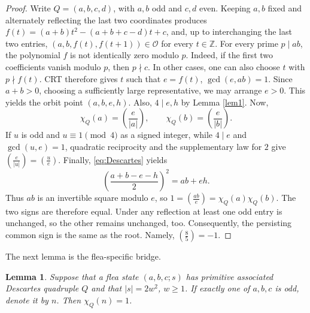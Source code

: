 \documentclass[12pt]{article}
\newtheorem{lemma}[theorem]{Lemma}
\theoremstyle{definition}
\theoremstyle{remark}
\newcommand{\Z}{\mathbb Z}
\newcommand{\OO}{\mathcal O}
\newcommand{\symb}[2]{\left(\frac{#1}{#2}\right)}
\begin{document}
\begin{proof}
Write $Q=(a,b,c,d)$, with $a,b$ odd and $c,d$ even. Keeping $a,b$ fixed and
alternately reflecting the last two coordinates produces
$f(t)=(a+b)t^2-(a+b+c-d)t+c$, and, up to interchanging the last two entries,
$(a,b,f(t),f(t+1))\in\OO$ for every $t\in\Z$. For every prime $p\mid ab$, the polynomial $f$ is not identically zero modulo $p$. Indeed, if the first two coefficients vanish modulo $p$, then $p\nmid c$. In other cases, one can also choose \(t\) with \(p\nmid f(t)\). CRT therefore gives $t$ such that $e=f(t)$,
$\gcd(e,ab)=1$. Since $a+b>0$, choosing a sufficiently large representative, we may arrange $e>0$. This yields the orbit point $(a,b,e,h)$. Also, $4\mid e,h$ by Lemma \ref{lem1}. Now,
\[
\chi_Q(a)=\symb{e}{|a|},\qquad \chi_Q(b)=\symb{e}{|b|}.
\]
If $u$ is odd and $u\equiv1\pmod4$ as a signed integer, while $4\mid e$ and
$\gcd(u,e)=1$, quadratic reciprocity and the supplementary law for $2$ give
$\symb{e}{|u|}=\symb{u}{e}$. Finally,  \eqref{eq:Descartes} yields
\[
\left(\frac{a+b-e-h}{2}\right)^2=ab+eh.
\]
Thus $ab$ is an invertible square modulo $e$, so
$1=\symb{ab}{e}=\chi_Q(a)\chi_Q(b)$. The two signs are therefore equal. Under any reflection at least one odd entry is unchanged, so the other remains unchanged, too. Consequently, the persisting common sign is the same as the root. Namely, $\symb{8}{5}=-1$.
\end{proof}

The next lemma is the flea-specific bridge.

\begin{lemma}\label{lem:ar}
	Suppose that a flea state $(a,b,c;s)$ has primitive associated Descartes
	quadruple $Q$ and that $|s|=2w^2$, $w\ge1$. If exactly one of $a,b,c$ is odd,
	denote it by $n$. Then $\chi_Q(n)=1$.
\end{lemma}
\end{document}
